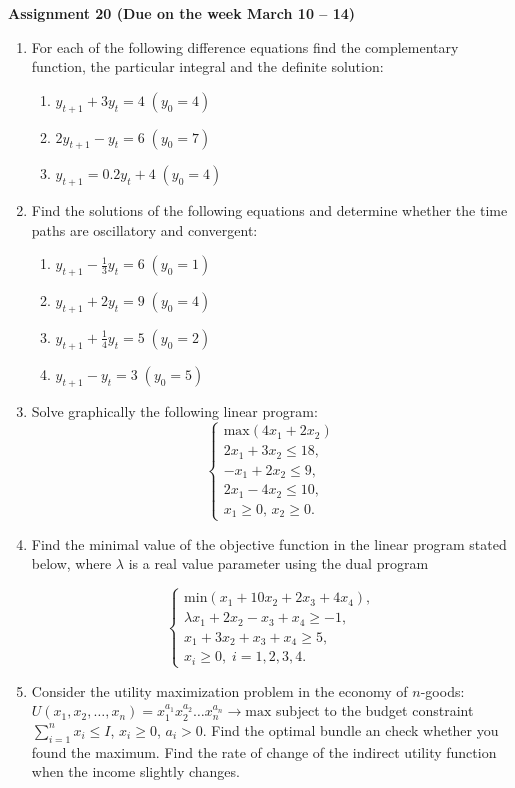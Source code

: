 \documentclass{article}
\begin{document}
\fontsize{14}{21}
\selectfont
\centerline{\textbf{Assignment 20 (Due on the week March 10 -- 14)}}
\fontsize{12}{18}
\selectfont
\begin{enumerate}
\item For each of the following difference equations find the complementary function, the particular integral and the definite solution:

\begin{enumerate}
\item $y_{t+1}+3y_t=4\; (y_0=4)$
\item $2y_{t+1}-y_t=6\; (y_0=7)$
\item $y_{t+1}=0.2y_t+4\; (y_0=4)$
\end{enumerate}

\item Find the solutions of the following equations and determine whether the time paths are oscillatory and convergent:
\begin{enumerate}
\item $y_{t+1}-\frac13y_t=6\; (y_0=1)$
\item $y_{t+1}+2y_t=9\; (y_0=4)$
\item $y_{t+1}+\frac14y_t=5\; (y_0=2)$
\item $y_{t+1}-y_t=3\; (y_0=5)$
\end{enumerate}

\item Solve graphically the following linear program:
$$
\begin{cases}
\mathrm{max}(4x_1+2x_2)\\
2x_1+3x_2\leqslant 18,\\
-x_1+2x_2\leqslant 9,\\
2x_1-4x_2\leqslant 10,\\
x_1\geqslant 0,\, x_2\geqslant 0.
\end{cases}
$$

\item Find the minimal value of the objective function in the linear program stated below, where $\lambda$ is a real value parameter using the dual program

$$
\begin{cases}
\mathrm{min} (x_1+10 x_2+2x_3+4x_4),\\
\lambda x_1+2x_2-x_3+x_4\geqslant -1,\\
x_1+3x_2+x_3+x_4\geqslant 5,\\
x_i\geqslant 0,\; i=1,2,3,4.
\end{cases}
$$

\item Consider the utility maximization problem in the economy of $n$-goods:\\ $U(x_1,x_2,\dots, x_n)=x_1^{a_1}x_2^{a_2}\dots x_n^{a_n}\rightarrow \mathrm{max}$ subject to the budget constraint $\sum\limits_{i=1}^nx_i\leqslant I$, $x_i\geqslant 0$, $a_i>0$.
Find the optimal bundle an check whether you found the maximum. Find the rate of change of the indirect utility function when the income slightly changes.
\end{enumerate}
\end{document}
